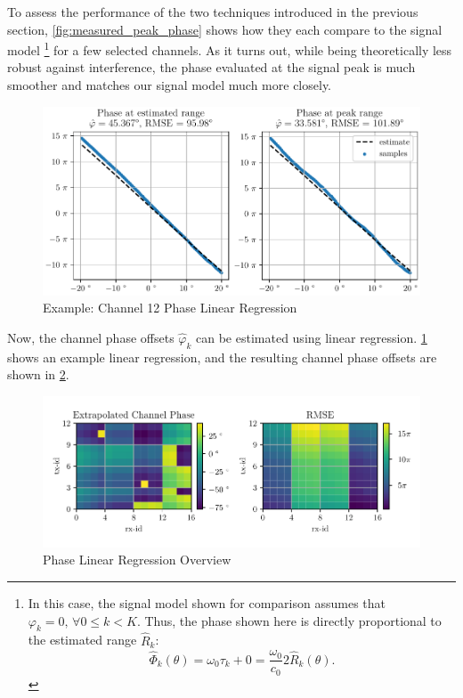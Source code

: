 To assess the performance of the two techniques introduced in the previous section,
\cref{fig:measured_peak_phase} shows how they each compare to the signal model
\footnote{
  In this case, the signal model shown for comparison assumes that $\varphi_k = 0,\, \forall 0 \leq k<K$.
  Thus, the phase shown here is directly proportional to the estimated range $\hat R_k$:
  $$
    \hat\Phi_k(\theta) = \omega_0 \tau_k + 0 =  \frac{\omega_0}{c_0}2\hat R_k(\theta).
  $$
} for a few selected channels.
As it turns out, while being theoretically less robust against interference,
the phase evaluated at the signal peak is much smoother and matches our signal model much more closely. \\
\begin{figure}
  \centering
  \includegraphics[width=\textwidth]{../figures/ch12_phase_linreg.pdf}
  \caption{Example: Channel 12 Phase Linear Regression}
  \label{fig:ch12_phase_linreg}
\end{figure}
Now, the channel phase offsets $\hat \varphi_k$ can be estimated using linear regression.
\cref{fig:ch12_phase_linreg} shows an example linear regression,
and the resulting channel phase offsets are shown in \cref{fig:phase_linreg}.
\begin{figure}
  \centering
  \includegraphics[width=\textwidth]{../figures/phase_linreg.pdf}
  \caption{Phase Linear Regression Overview}
  \label{fig:phase_linreg}
\end{figure}

